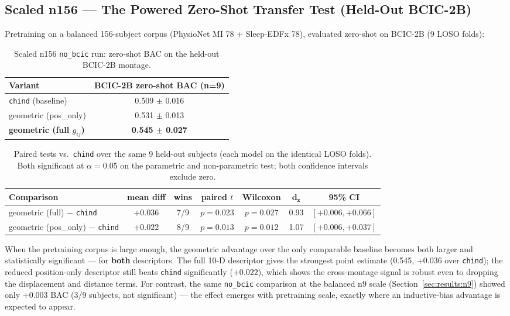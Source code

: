 \documentclass[11pt]{article}
\begin{document}
\subsection{Scaled n156 --- The Powered Zero-Shot Transfer Test (Held-Out BCIC-2B)}
\label{sec:results:n156}

Pretraining on a balanced 156-subject corpus (PhysioNet MI 78 + Sleep-EDFx
78), evaluated zero-shot on BCIC-2B (9 LOSO folds):

\begin{table}[h]
\centering
\caption{Scaled n156 \texttt{no\_bcic} run: zero-shot BAC on the held-out
BCIC-2B montage.}
\label{tab:n156}
\small
\begin{tabular}{lc}
\toprule
\textbf{Variant} & \textbf{BCIC-2B zero-shot BAC (n=9)} \\
\midrule
\texttt{chind} (baseline)          & 0.509 $\pm$ 0.016 \\
geometric (pos\_only)              & 0.531 $\pm$ 0.013 \\
\textbf{geometric (full $g_{ij}$)} & \textbf{0.545 $\pm$ 0.027} \\
\bottomrule
\end{tabular}
\end{table}

\begin{table}[h]
\centering
\caption{Paired tests vs.\ \texttt{chind} over the same 9 held-out subjects
(each model on the identical LOSO folds). Both significant at
$\alpha = 0.05$ on the parametric and non-parametric test; both confidence
intervals exclude zero.}
\label{tab:paired}
\small
\begin{tabular}{lcccccc}
\toprule
\textbf{Comparison} & \textbf{mean diff} & \textbf{wins} & \textbf{paired $t$} & \textbf{Wilcoxon} & $\boldsymbol{d_z}$ & \textbf{95\% CI} \\
\midrule
geometric (full) $-$ \texttt{chind}     & $+0.036$ & 7/9 & $p = 0.023$ & $p = 0.027$ & 0.93 & $[+0.006, +0.066]$ \\
geometric (pos\_only) $-$ \texttt{chind} & $+0.022$ & 8/9 & $p = 0.013$ & $p = 0.012$ & 1.07 & $[+0.006, +0.037]$ \\
\bottomrule
\end{tabular}
\end{table}

When the pretraining corpus is large enough, the geometric advantage over the
only comparable baseline becomes both larger and statistically significant
--- for \textbf{both} descriptors. The full 10-D descriptor gives the
strongest point estimate (0.545, $+0.036$ over \texttt{chind}); the reduced
position-only descriptor still beats \texttt{chind} significantly ($+0.022$),
which shows the cross-montage signal is robust even to dropping the
displacement and distance terms. For contrast, the same \texttt{no\_bcic}
comparison at the balanced n9 scale (Section~\ref{sec:results:n9}) showed only
$+0.003$ BAC (3/9 subjects, not significant) --- the effect emerges with
pretraining scale, exactly where an inductive-bias advantage is expected to
appear.
\end{document}
